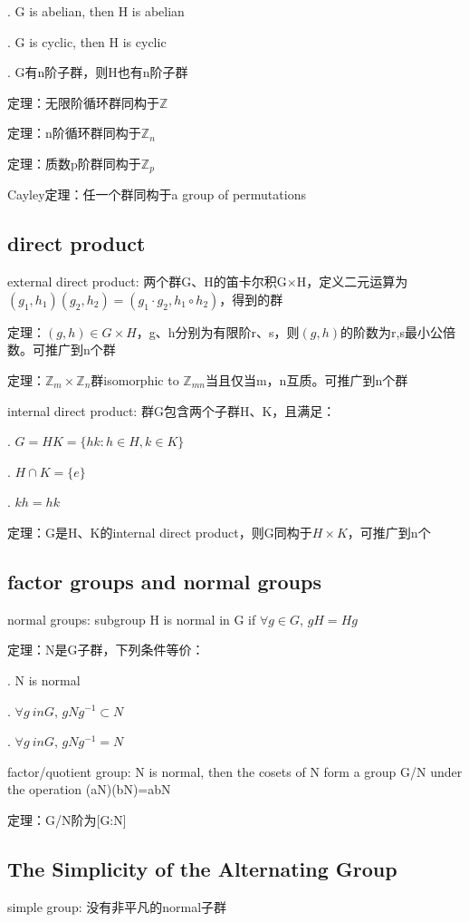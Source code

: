 \documentclass[cn,hazy,blue,screen,14pt]{note}
\begin{document}
. G is abelian, then H is abelian

. G is cyclic, then H is cyclic

. G有n阶子群，则H也有n阶子群

定理：无限阶循环群同构于$\mathbb{Z}$

定理：n阶循环群同构于$\mathbb{Z}_{n}$

定理：质数p阶群同构于$\mathbb{Z}_{p}$

Cayley定理：任一个群同构于a group of permutations

\subsection{direct product}
external direct product: 两个群G、H的笛卡尔积G$\times$H，定义二元运算为$(g_{1},h_{1})(g_{2},h_{2})=(g_{1}\cdot g_{2},h_{1}\circ h_{2})$，得到的群

定理：$(g,h)\in G\times H$，g、h分别为有限阶r、s，则$(g,h)$的阶数为r,s最小公倍数。可推广到n个群

定理：$\mathbb{Z}_{m}\times \mathbb{Z}_{n}$群isomorphic to $\mathbb{Z}_{mn}$当且仅当m，n互质。可推广到n个群

internal direct product: 群G包含两个子群H、K，且满足：

. $G=HK=\{hk:h\in H,k\in K\}$

. $H\cap K=\{e\}$

. $kh=hk$

定理：G是H、K的internal direct product，则G同构于$H\times K$，可推广到n个

\subsection{factor groups and normal groups}
normal groups: subgroup H is normal in G if $\forall g\in G$, $gH=Hg$

定理：N是G子群，下列条件等价：

. N is normal  

. $\forall g\ in G$, $gNg^{-1}\subset N$

. $\forall g\ in G$, $gNg^{-1}= N$

factor/quotient group: N is normal, then the cosets of N form a group G/N under the operation (aN)(bN)=abN

定理：G/N阶为[G:N] 

\subsection{The Simplicity of the Alternating Group}
simple group: 没有非平凡的normal子群
\end{document}
